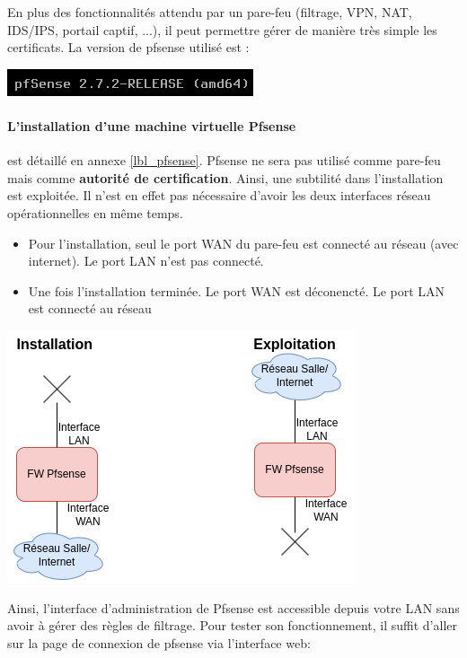 \documentclass[french, 12pt]{article}%
\newcommand{\itemE}{\item[$\bullet$]}
\begin{document}
En plus des fonctionnalités attendu par un pare-feu (filtrage, VPN, NAT, IDS/IPS, portail captif, ...), il peut permettre gérer de manière très simple les certificats. La version de pfsense utilisé est : 
\begin{center}
\includegraphics[scale=0.7]{./ressource/versionPfsense}
\end{center}


\paragraph{L'installation d'une machine virtuelle Pfsense} est détaillé en annexe \ref{lbl_pfsense}.  Pfsense ne sera pas utilisé comme pare-feu mais comme \textbf{autorité de certification}.  Ainsi, une subtilité dans l'installation est exploitée. Il n'est en effet pas nécessaire d'avoir les deux interfaces réseau opérationnelles en même temps. 
\begin{itemize}
\itemE Pour l'installation, seul le port WAN du pare-feu est connecté au réseau (avec internet). Le port LAN n'est pas connecté.
\itemE Une fois l'installation terminée. Le port WAN est déconencté. Le port LAN est connecté au réseau
\end{itemize}

\begin{center}
\includegraphics[scale=0.7]{./ressource/installPfense.png}
\end{center}

Ainsi, l'interface d'administration de Pfsense est accessible depuis votre LAN sans avoir à gérer des règles de filtrage. Pour tester son fonctionnement, il suffit d'aller sur la page de connexion de pfsense via l'interface web: 
\end{document}
